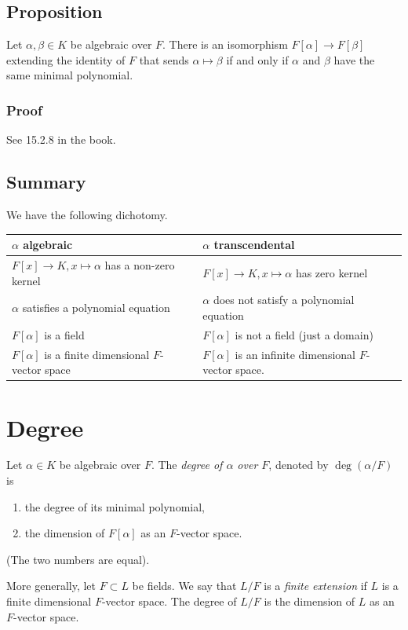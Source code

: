\documentclass[11pt]{article}
\begin{document}
\subsection{Proposition}
\label{sec:org96f9d51}
Let \(\alpha, \beta \in K\) be algebraic over \(F\).
There is an isomorphism \(F[\alpha] \to F[\beta]\) extending the identity of \(F\) that sends \(\alpha \mapsto \beta\) if and only if \(\alpha\) and \(\beta\) have the same minimal polynomial.
\subsubsection{Proof}
\label{sec:orgcfa1086}
See 15.2.8 in the book.
\subsection{Summary}
\label{sec:orgd605659}
We have the following dichotomy.
\begin{center}
\begin{tabular}{ll}
\hline
\(\alpha\) algebraic & \(\alpha\) transcendental\\
\hline
\(F[x] \to K, x \mapsto \alpha\) has a non-zero kernel & \(F[x] \to K, x \mapsto \alpha\) has zero kernel\\
\(\alpha\) satisfies a polynomial equation & \(\alpha\) does not satisfy a polynomial equation\\
\(F[\alpha]\) is a field & \(F[\alpha]\) is not a field (just a domain)\\
\(F[\alpha]\) is a finite dimensional \(F\)-vector space & \(F[\alpha]\) is an infinite dimensional \(F\)-vector space.\\
\hline
\end{tabular}
\end{center}
\section{Degree}
\label{sec:orgdeba078}
Let \(\alpha \in K\) be algebraic over \(F\).
The \emph{degree of \(\alpha\) over \(F\)}, denoted by \(\deg(\alpha/F)\) is
\begin{enumerate}
\item the degree of its minimal polynomial,
\item the dimension of \(F[\alpha]\) as an \(F\)-vector space.
\end{enumerate}
(The two numbers are equal).

More generally, let \(F \subset L\) be fields.
We say that \(L/F\) is a \emph{finite extension} if \(L\) is a finite dimensional \(F\)-vector space.
The degree of \(L/F\) is the dimension of \(L\) as an \(F\)-vector space.
\end{document}
